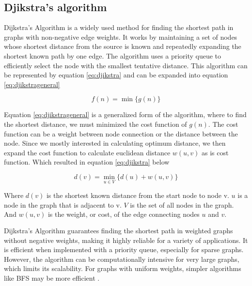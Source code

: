 \documentclass[12pt]{report}
\begin{document}
        \subsection{Djikstra's algorithm}
        Dijkstra's Algorithm is a widely used method for finding the shortest path in graphs with non-negative edge
        weights. It works by maintaining a set of nodes whose shortest distance from the source is known and repeatedly
        expanding the shortest known path by one edge. The algorithm uses a priority queue to efficiently select the
        node with the smallest tentative distance. This algorithm can be represented by equation \ref{eq:djikstra} and
        can be expanded into equation \ref{eq:djikstrageneral}

        \begin{equation}\label{eq:djikstrageneral}
            f(n) = \min_{} \{ g(n)\}
        \end{equation}

        Equation \ref{eq:djikstrageneral} is a generalized form of the algorithm, where to find the shortest distance,
        we must minimized the cost function of \(g(n)\). The cost function can be a weight between node connection or
        the distance between the node. Since we mostly interested in calculating optimum distance, we then expand the
        cost function to calculate euclidean distance \(w(u,v)\) as is cost function. Which resulted in equation
        \ref{eq:djikstra} below

        \begin{equation}\label{eq:djikstra}
            d(v) = \min_{u \in V} \{ d(u) + w(u, v) \}
        \end{equation}

        Where \(d(v)\) is the shortest known distance from the start node to node v. \(u\) is a node in the graph that
        is adjacent to v. \(V\) is the set of all nodes in the graph. And \(w(u, v)\) is the weight, or cost, of the
        edge connecting nodes \(u\) and \(v\).

        Dijkstra's Algorithm guarantees finding the shortest path in weighted graphs without negative weights, making it
        highly reliable for a variety of applications. It is efficient when implemented with a priority queue,
        especially for sparse graphs. However, the algorithm can be computationally intensive for very large graphs,
        which limits its scalability. For graphs with uniform weights, simpler algorithms like BFS may be more efficient
        \cite{dijkstra_note_2022}.
\end{document}
